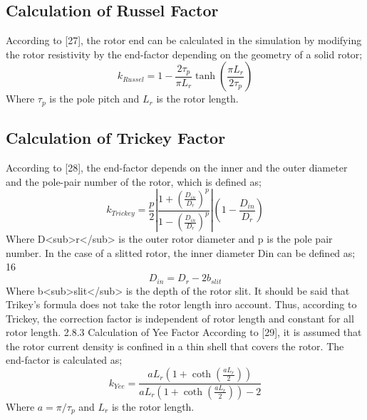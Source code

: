 \subsection{Calculation of Russel Factor} %

According to [27], the rotor end can be calculated in the simulation by modifying the
rotor resistivity by the end-factor depending on the geometry of a solid rotor;
%
\begin{equation}\label{eq:2.22}
k_{Russel} = 1 - \frac{2\tau_p}{\pi L_r} \tanh\left(\frac{\pi L_r}{2\tau_p}\right)
\end{equation}
%
Where $\tau_p$ is the pole pitch and $L_r$ is the rotor length.

\subsection{Calculation of Trickey Factor} %

According to [28], the end-factor depends on the inner and the outer diameter and the
pole-pair number of the rotor, which is defined as;
%
\begin{equation}\label{eq:2.23}
k_{Trickey} = \frac{p}{2} \left| \frac{1 + \left(\frac{D_{in}}{D_r}\right)^p}{1 - \left(\frac{D_{in}}{D_r}\right)^p} \right| \left(1 - \frac{D_{in}}{D_r}\right)
\end{equation}
%
Where D<sub>r</sub> is the outer rotor diameter and p is the pole pair number. In the case of a
slitted rotor, the inner diameter Din can be defined as;
16
%
\begin{equation}\label{eq:2.24}
D_{in} = D_r - 2b_{slit}
\end{equation}
%
Where b<sub>slit</sub> is the depth of the rotor slit. It should be said that Trikey's formula does
not take the rotor length inro account. Thus, according to Trickey, the correction
factor is independent of rotor length and constant for all rotor length.
2.8.3 Calculation of Yee Factor
According to [29], it is assumed that the rotor current density is confined in a thin
shell that covers the rotor. The end-factor is calculated as;
%
\begin{equation}\label{eq:2.25}
k_{Yee} = \frac{aL_r \left( 1 + \coth\left(\frac{aL_r}{2}\right) \right)}{aL_r \left( 1 + \coth\left(\frac{aL_r}{2}\right) \right) - 2}
\end{equation}
%
Where $a = \pi/\tau_p$ and $L_r$ is the rotor length.

